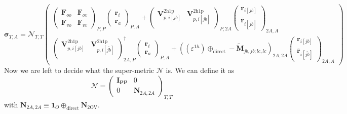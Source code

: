 \[
\bm{\sigma}_{T,A}
= 
\bm{\mathcal{N}}_{T,T}
\begin{pmatrix}
 \begin{pmatrix}
\bm{F}_{oo} & \bm{F}_{ov} \\ \bm{F}_{vo} & \bm{F}_{vv}
\end{pmatrix}_{P,P} \begin{pmatrix}
\bm{r}_i \\ \bm{r}_a
\end{pmatrix}_{P,A} + \begin{pmatrix}
    \bm{V}^{2 \mathrm{h1p}}_{p,i[jb]} & \bm{V}^{2 \mathrm{h1p}}_{p,i[\bar{jb}]} \\
\end{pmatrix}_{P,2A} \begin{pmatrix}
    \bm{r}_{i[jb]} \\
\bm{\bar{r}}_{i[\bar{jb}]}
\end{pmatrix}_{2A,A} \\[6pt]
 \begin{pmatrix}
    \bm{V}^{2 \mathrm{h1p}}_{p,i[jb]} & \bm{V}^{2 \mathrm{h1p}}_{p,i[\bar{jb}]} \\
\end{pmatrix}^\dag_{2A,P} \begin{pmatrix}
\bm{r}_i \\ \bm{r}_a
\end{pmatrix}_{P,A} +
\left(\left(\varepsilon^{1h}\right) \oplus_{\text{direct}} -\bm{\tilde{M}}_{jb,jb;lc,lc}\right)_{2A,2A} \begin{pmatrix}
    \bm{r}_{i[jb]} \\
\bm{\bar{r}}_{i[\bar{jb}]}
\end{pmatrix}_{2A,A}
\end{pmatrix}
\]
Now we are left to decide what the super-metric $\bm{\mathcal{N}}$ is. We can define it as
\[\bm{\mathcal{N}} =
\begin{pmatrix}
\bm{I_{PP}} & 0 \\[3pt]
0 & \bm{N}_{2A,2A}
\end{pmatrix}_{T,T}
\]
 with $\bm{N}_{2A,2A} \equiv \bm{1}_{O} \oplus_{\text{direct}} \bm{N}_{\text{2OV}}$. 

